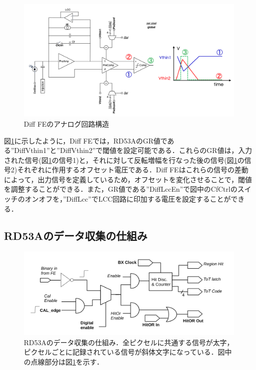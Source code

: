 \begin{figure}[h]
\centering
\includegraphics[width=15cm]{./figure/RD53A_DiffFE.png}
\caption{Diff FEのアナログ回路構造\cite{Garcia-Sciveres:2287593}}
\label{fig:DiffFE}
\end{figure}

図\ref{fig:DiffFE}に示したように，Diff FEでは，RD53AのGR値である''DiffVthin1''と''DiffVthin2''で閾値を設定可能である．これらのGR値は，入力された信号(図\ref{fig:DiffFE}の信号1)と，それに対して反転増幅を行なった後の信号(図\ref{fig:DiffFE}の信号2)それぞれに作用するオフセット電圧である．Diff FEはこれらの信号の差動によって，出力信号を定義しているため，オフセットを変化させることで，閾値を調整することができる．また，GR値である''DiffLccEn''で図中のCfCtrlのスイッチのオンオフを，''DiffLcc''でLCC回路に印加する電圧を設定することができる．

\subsection{RD53Aのデータ収集の仕組み}

\begin{figure}[h]
  \centering
  \includegraphics[width=13cm]{./figure/RD53Aproc.png}
  \caption{RD53Aのデータ収集の仕組み．全ピクセルに共通する信号が太字，ピクセルごとに記録されている信号が斜体文字になっている．図中の点線部分は図\ref{fig:DiffFE}を示す．\cite{Garcia-Sciveres:2287593}}
  \label{fig:RD53Aproc}
\end{figure}

